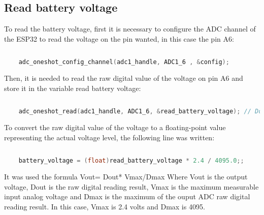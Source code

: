 \documentclass[../report.tex]{subfiles}
\begin{document}
\subsection{Read battery voltage}
To read the battery voltage, first it is necessary to configure the ADC
 channel of the ESP32 to read the voltage on the pin wanted, in this case the pin A6:

 \begin{lstlisting}[language=c,caption={configure ADC channel},label={code:battery voltage}]
    
    adc_oneshot_config_channel(adc1_handle, ADC1_6 , &config);

\end{lstlisting}

Then, it is needed to read the raw digital value of the voltage on pin A6
 and store it in the variable read battery voltage:

\begin{lstlisting}[language=c,caption={ reading of the raw digital value},label={code:battery voltage}]
    
    adc_oneshot_read(adc1_handle, ADC1_6, &read_battery_voltage); // Dout = read_battery_voltage

\end{lstlisting}

To convert the raw digital value of the voltage to a floating-point value
 representing the actual voltage level, the following line was written:

\begin{lstlisting}[language=c,caption={ convert raw digital value to a floating point},label={code:battery voltage}]
    
    battery_voltage = (float)read_battery_voltage * 2.4 / 4095.0;;


\end{lstlisting}

It was used the formula    Vout= Dout* Vmax/Dmax Where Vout is the output voltage,
 Dout is the raw digital reading result, Vmax is the maximum measurable input analog
  voltage and Dmax is the maximum of the ouput ADC raw digital reading result. 
  In this case, Vmax is 2.4 volts and Dmax is 4095. 
\end{document}
